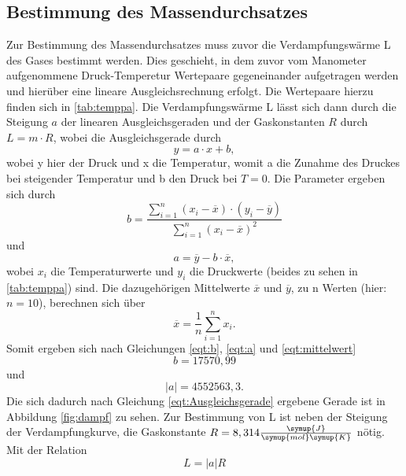\subsection{Bestimmung des Massendurchsatzes}

Zur Bestimmung des Massendurchsatzes muss zuvor die Verdampfungswärme L des Gases bestimmt werden. Dies geschieht, in dem zuvor vom Manometer aufgenommene
Druck-Temperetur Wertepaare gegeneinander aufgetragen werden und hierüber eine lineare Ausgleichsrechnung erfolgt. Die Wertepaare hierzu finden sich in \autoref {tab:temppa}.
Die Verdampfungswärme L lässt sich dann durch die Steigung $a$ der linearen Ausgleichsgeraden und der Gaskonstanten $R$ durch $L = m \cdot R$, wobei die Ausgleichsgerade durch
\begin{equation}
  \label{eqt:Ausgleichsgerade}
  y = a \cdot x + b,
\end{equation}
wobei y hier der Druck und x die Temperatur, womit a die Zunahme des Druckes bei steigender Temperatur und b den Druck bei $ T = 0$.
Die Parameter ergeben sich durch
\begin{equation}
\label{eqt:b}
  b = \frac {\sum_{i=1}^n (x_i - \overline{x}) \cdot (y_i - \overline{y})}{\sum_{i=1}^n (x_i - \overline{x})^2}
\end{equation}
und 
\begin{equation}
\label{eqt:a}
  a = \overline{y} - b \cdot \overline{x}, 
\end{equation}
wobei $x_i$ die Temperaturwerte und $y_i$ die Druckwerte (beides zu sehen in \autoref{tab:temppa}) sind. Die dazugehörigen Mittelwerte $\overline{x}$ und $\overline{y}$, zu n Werten (hier: $n = 10$), berechnen sich über
\begin{equation}
\label{eqt:mittelwert}
  \overline{x} = \frac {1}{n} \sum_{i=1}^n x_i . 
\end{equation}
Somit ergeben sich nach Gleichungen \eqref{eqt:b}, \eqref{eqt:a} und \eqref{eqt:mittelwert}
\begin{equation}
    b = 17570,99
\end{equation}
und 
\begin{equation}
 \lvert a \rvert = 4552563,3 . 
\end{equation}
Die sich dadurch nach Gleichung \eqref{eqt:Ausgleichsgerade} ergebene Gerade ist in Abbildung \ref{fig:dampf} zu sehen.
Zur Bestimmung von L ist neben der Steigung der Verdampfungkurve, die Gaskonstante $R = 8,314 \frac{\symup{J}}{\symup{mol} \symup{K}}$ nötig.
Mit der Relation
\begin{equation}
  L = \lvert a \rvert R
\end{equation}
